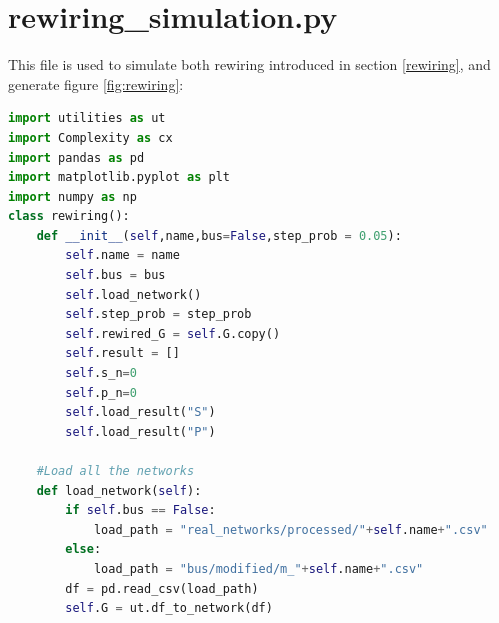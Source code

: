 \documentclass[12pt]{article}
\begin{document}
\section{rewiring\_simulation.py}
This file is used to simulate both rewiring introduced in section \ref{rewiring}, and generate figure \ref{fig:rewiring}:
\begin{lstlisting}[breaklines=true,language=Python]
import utilities as ut
import Complexity as cx
import pandas as pd
import matplotlib.pyplot as plt
import numpy as np
class rewiring():
    def __init__(self,name,bus=False,step_prob = 0.05):
        self.name = name
        self.bus = bus
        self.load_network()
        self.step_prob = step_prob
        self.rewired_G = self.G.copy()
        self.result = []
        self.s_n=0
        self.p_n=0
        self.load_result("S")
        self.load_result("P")

    #Load all the networks
    def load_network(self):
        if self.bus == False:
            load_path = "real_networks/processed/"+self.name+".csv"
        else:
            load_path = "bus/modified/m_"+self.name+".csv"
        df = pd.read_csv(load_path)
        self.G = ut.df_to_network(df)


\end{lstlisting}
\end{document}
